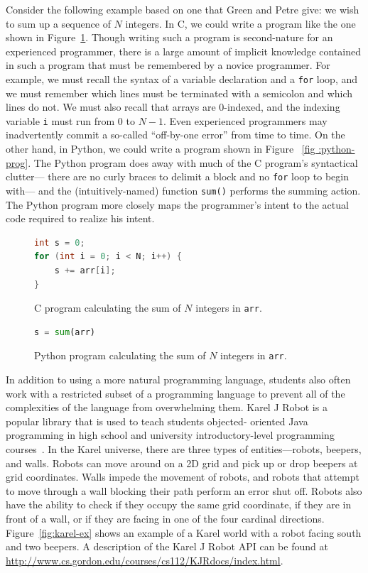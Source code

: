 \documentclass[11pt]{article}
\begin{document}
Consider the following example based on one that Green and Petre give: we wish to sum up a sequence
of $N$ integers. In C, we could write a program like the one shown in Figure~\ref{fig:c-prog}.
Though writing such a program is second-nature for an experienced programmer, there is a large
amount of implicit knowledge contained in such a program that must be remembered by a novice
programmer. For example, we must recall the syntax of a variable declaration and a \texttt{for}
loop, and we must remember which lines must be terminated with a semicolon and which lines do not.
We must also recall that arrays are 0-indexed, and the indexing variable \texttt{i} must run from 0
to $N - 1$. Even experienced programmers may inadvertently commit a so-called ``off-by-one error''
from time to time. On the other hand, in Python, we could write a program shown in Figure ~\ref{fig
:python-prog}. The Python program does away with much of the C program's syntactical clutter---
there are no curly braces to delimit a block and no \texttt{for} loop to begin with--- and the
(intuitively-named) function \texttt{sum()} performs the summing action.  The Python program more
closely maps the programmer's intent to the actual code required to realize his intent.

\begin{figure}[ht]
\begin{lstlisting}[language=C]
int s = 0;
for (int i = 0; i < N; i++) {
    s += arr[i];
}
\end{lstlisting}
\label{fig:c-prog}
\caption{C program calculating the sum of $N$ integers in \texttt{arr}.}
\end{figure}

\begin{figure}[ht]
\begin{lstlisting}[language=python]
s = sum(arr)
\end{lstlisting}
\label{fig:python-prog}
\caption{Python program calculating the sum of $N$ integers in \texttt{arr}.}
\end{figure}

In addition to using a more natural programming language, students also often work with a
restricted subset of a programming language to prevent all of the complexities of the language from
overwhelming them. Karel J Robot is a popular library that is used to teach students objected-
oriented Java programming in high school and university introductory-level programming
courses~\cite{Bergin:2013aa}. In the Karel universe, there are three types of entities---robots,
beepers, and walls. Robots can move around on a 2D grid and pick up or drop beepers at grid
coordinates. Walls impede the movement of robots, and robots that attempt to move through a wall
blocking their path perform an error shut off. Robots also have the ability to check if they occupy
the same grid coordinate, if they are in front of a wall, or if they are facing in one of the four
cardinal directions. Figure~\ref{fig:karel-ex} shows an example of a Karel world with a robot
facing south and two beepers. A description of the Karel J Robot API can be found at
\url{http://www.cs.gordon.edu/courses/cs112/KJRdocs/index.html}.
\end{document}
